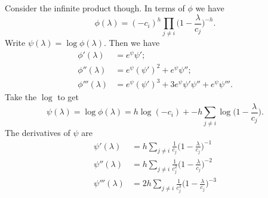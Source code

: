 \documentclass[12pt]{article}
\begin{document}
Consider the infinite product though.  In terms of $\phi$ we have
\[
\phi(\lambda) = (-c_i)^h \prod_{j \neq i} \Big(1 - \frac{\lambda}{c_j}\Big)^{-h}.
\]
Write $\psi(\lambda) = \log \phi (\lambda)$.  Then we have
\begin{align*}
\phi'(\lambda) & = e^{\psi} \psi'; \\
\phi''(\lambda) & = e^{\psi} (\psi')^2 + e^{\psi} \psi''; \\
\phi'''(\lambda) & = e^{\psi} (\psi')^3 + 3 e^{\psi} \psi' \psi'' + e^{\psi} \psi'''.
\end{align*}
Take the $\log$ to get
\[
\psi(\lambda) = \log \phi(\lambda) = h \log (-c_i) + -h \sum_{j \neq i} \log \Big( 1 -
\frac{\lambda}{c_j}\Big).
\]
The derivatives of $\psi$ are 
\begin{align*}
\psi'(\lambda) & = h \sum_{j \neq i} \frac{1}{c_j} \Big( 1 - \frac{\lambda}{c_j}\Big)^{-1} \\
\psi''(\lambda) & = h \sum_{j \neq i} \frac{1}{c_j^2} \Big( 1 - \frac{\lambda}{c_j}\Big)^{-2} \\
\psi'''(\lambda) & = 2 h \sum_{j \neq i} \frac{1}{c_j^3} \Big( 1 - \frac{\lambda}{c_j}\Big)^{-3}
\end{align*}


% 
\end{document}
